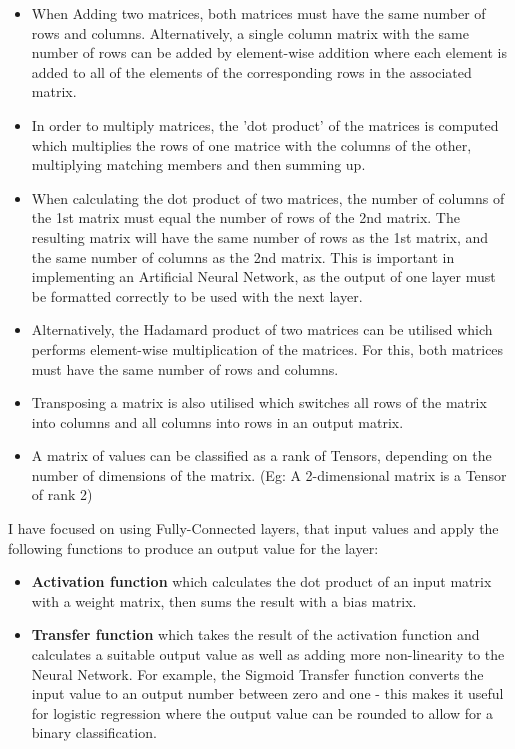 \documentclass[./project-report/src/latex/project-report.tex]{subfiles}
\begin{document}
\begin{itemize}
    \item When Adding two matrices, both matrices must have the same number of rows and columns. Alternatively, a single column matrix with the same number of rows can be 
          added by element-wise addition where each element is added to all of the elements of the corresponding rows in the associated matrix.
    \item In order to multiply matrices, the 'dot product' of the matrices is computed which multiplies the rows of one matrice with the columns of the other, multiplying 
          matching members and then summing up.
    \item When calculating the dot product of two matrices, the number of columns of the 1st matrix must equal the number of rows of the 2nd matrix. The resulting matrix will 
          have the same number of rows as the 1st matrix, and the same number of columns as the 2nd matrix. This is important in implementing an Artificial Neural Network, 
          as the output of one layer must be formatted correctly to be used with the next layer.
    \item Alternatively, the Hadamard product of two matrices can be utilised which performs element-wise multiplication of the matrices. For this, both matrices 
          must have the same number of rows and columns.
    \item Transposing a matrix is also utilised which switches all rows of the matrix into columns and all columns into rows in an output matrix.
    \item A matrix of values can be classified as a rank of Tensors, depending on the number of dimensions of the matrix. (Eg: A 2-dimensional matrix is a Tensor of 
          rank 2)
\end{itemize}

I have focused on using Fully-Connected layers, that input values and apply the following functions to produce an output value for the layer:

\begin{itemize}
    \item \textbf{Activation function} which calculates the dot product of an input matrix with a weight matrix, then sums the result with a bias matrix.
    \item \textbf{Transfer function} which takes the result of the activation function and calculates a suitable output value as well as adding more non-linearity to the Neural Network. 
          For example, the Sigmoid Transfer function converts the input value to an output number between zero and one - this makes it useful for logistic regression where the output value 
          can be rounded to allow for a binary classification.
\end{itemize}
\end{document}
